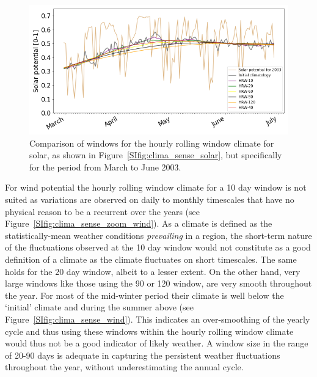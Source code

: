 \documentclass[a4paper,11pt]{extarticle}
\begin{document}
\begin{figure}[t]
    \centering
    \includegraphics[width=\textwidth]{Climatology_sensitivity_zoom_solar}
    \caption{Comparison of windows for the hourly rolling window climate for solar, as shown in Figure~\ref{SIfig:clima_sense_solar}, but specifically for the period from March to June 2003.}
    \label{SIfig:clima_sense_zoom_solar}
\end{figure}


For wind potential the hourly rolling window climate for a 10 day window is not suited as variations are observed on daily to monthly timescales that have no physical reason to be a recurrent over the years (see Figure~\ref{SIfig:clima_sense_zoom_wind}). As a climate is defined as the statistically-mean weather conditions \emph{prevailing} in a region, the short-term nature of the fluctuations observed at the 10 day window would not constitute as a good definition of a climate as the climate fluctuates on short timescales. The same holds for the 20 day window, albeit to a lesser extent. On the other hand, very large windows like those using the 90 or 120 window, are very smooth throughout the year. For most of the mid-winter period their climate is well below the `initial' climate and during the summer above (see Figure~\ref{SIfig:clima_sense_wind}). This indicates an over-smoothing of the yearly cycle and thus using these windows within the hourly rolling window climate would thus not be a good indicator of likely weather. A window size in the range of 20-90 days is adequate in capturing the persistent weather fluctuations throughout the year, without underestimating the annual cycle.
\end{document}
